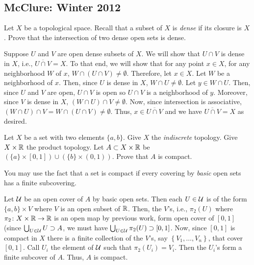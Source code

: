 \subsection{McClure: Winter 2012}
\setcounter{exercise}{0}

\begin{problem}
  Let \(X\) be a topological space. Recall that a subset of \(X\) is
  \emph{dense} if its closure is \(X\). Prove that the intersection of two
  dense open sets is dense.
\end{problem}
\begin{solution}
  Suppose \(U\) and \(V\) are open dense subsets of \(X\). We will show
  that \(U\cap V\) is dense in \(X\), i.e., \(\overline{U\cap V}=X\). To
  that end, we will show that for any point \(x\in X\), for any
  neighborhood \(W\) of \(x\), \(W\cap(U\cap V)\neq\emptyset\). Therefore,
  let \(x\in X\). Let \(W\) be a neighborhood of \(x\). Then, since \(U\)
  is dense in \(X\), \(W\cap U\neq\emptyset\). Let \(y\in W\cap U\). Then,
  since \(U\) and \(V\) are open, \(U\cap V\) is open so \(U\cap V\) is a
  neighborhood of \(y\). Moreover, since \(V\) is dense in \(X\),
  \((W\cap U)\cap V\neq\emptyset\). Now, since intersection is associative,
  \((W\cap U)\cap V=W\cap(U\cap V)\neq\emptyset\). Thus,
  \(x\in\overline{U\cap V}\) and we have \(\overline{U\cap V}=X\) as
  desired.
\end{solution}

\begin{problem}
  Let \(X\) be a set with two elements \(\{a,b\}\). Give \(X\) the
  \emph{indiscrete} topology. Give \(X\times\mathbb{R}\) the product
  topology. Let \(A\subset X\times\mathbb{R}\) be
  \((\{a\}\times[0,1])\cup(\{b\}\times(0,1))\). Prove that \(A\) is
  compact.

  You may use the fact that a set is compact if every covering by
  \emph{basic} open sets has a finite subcovering.
\end{problem}
\begin{solution}
  Let \(\mathcal{U}\) be an open cover of \(A\) by basic open sets. Then each
  \(U\in\mathcal{U}\) is of the form \(\{a,b\}\times V\) where \(V\) is an open
  subset of \(\mathbb{R}\). Then, the \(V\)'s, i.e., \(\pi_2(U)\) where
  \(\pi_2\colon X\times\mathbb{R}\to\mathbb{R}\) is an open map by previous work, form
  open cover of \([0,1]\) (since \(\bigcup_{U\in\mathcal{U}} U\supset A\), we
  must have \(\bigcup_{U\in\mathcal{U}}\pi_2(U)\supset[0,1]\). Now, since
  \([0,1]\) is compact in \(X\) there is a finite collection of the
  \(V\)'s, say \(\left\{V_1,\dotsc,V_n\right\}\), that cover
  \([0,1]\). Call \(U_i\) the element of \(\mathcal{U}\) such that
  \(\pi_2(U_i)=V_i\). Then the \(U_i\)'s form a finite subcover of
  \(A\). Thus, \(A\) is compact.
\end{solution}

